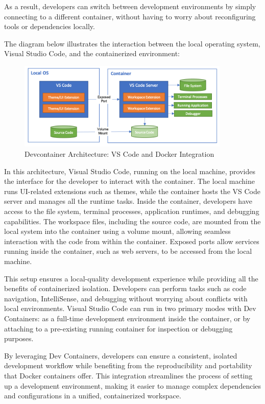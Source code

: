 As a result, developers can switch between development environments by simply
connecting to a different container, without having to worry about reconfiguring
tools or dependencies locally.

The diagram below illustrates the interaction between the local operating system,
Visual Studio Code, and the containerized environment:

\begin{figure}[H]
	\centering
	\includegraphics[width=0.9\textwidth]{assets/images/architecture-containers.png}
	\caption{Devcontainer Architecture: VS Code and Docker Integration \cite{DevelopingContainerUsing}}
\end{figure}

In this architecture, Visual Studio Code, running on the local machine, provides the
interface for the developer to interact with the container. The local machine runs
UI-related extensions such as themes, while the container hosts the VS Code server
and manages all the runtime tasks.
Inside the container, developers have access to
the file system, terminal processes, application runtimes, and debugging capabilities.
The workspace files, including the source code, are mounted from the local system
into the container using a volume mount, allowing seamless interaction with the code
from within the container. Exposed ports allow services running inside the container,
such as web servers, to be accessed from the local machine.

This setup ensures a local-quality development experience while providing all the
benefits of containerized isolation. Developers can perform tasks such as
code navigation, IntelliSense, and debugging without worrying about conflicts with
local environments. Visual Studio Code can run in two primary modes with Dev Containers:
as a full-time development environment inside the container, or by attaching to a
pre-existing running container for inspection or debugging purposes.

By leveraging Dev Containers, developers can ensure a consistent, isolated development
workflow while benefiting from the reproducibility and portability that Docker containers
offer. This integration streamlines the process of setting up a development environment,
making it easier to manage complex dependencies and configurations in a unified,
containerized workspace.

